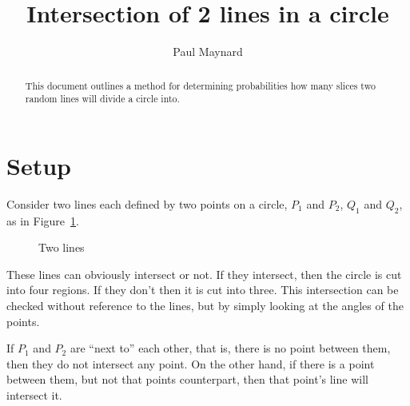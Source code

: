 \documentclass[twocolumn]{article}
\title{Intersection of 2 lines in a circle}
\author{Paul Maynard}
\begin{document}
\maketitle

\begin{abstract}
This document outlines a method for determining probabilities how many slices two random lines will divide a circle into.
\end{abstract}

\section{Setup}
Consider two lines each defined by two points on a circle,
$P_1$ and $P_2$, $Q_1$ and $Q_2$, as in Figure~\ref{fig:2lines}. 

\vspace{1pc}

\begin{figure}[h]
\centering
\caption{Two lines}
\label{fig:2lines}
\end{figure}

These lines can obviously intersect or not. If they intersect, then the circle is cut into four regions.
If they don't then it is cut into three. This intersection can be checked 
without reference to the lines, but by simply looking at the angles of the points.

If $P_1$ and $P_2$ are ``next to'' each other, that is, there is no point between them, then they do not intersect any point.
On the other hand, if there is a point between them, but not that points counterpart, then that point's line will intersect it.
\end{document}
